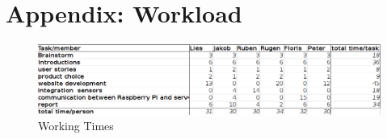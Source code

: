 \section{Appendix: Workload}
\begin{figure}[H]
  \center
  \includegraphics[width=1.5\linewidth, angle=90]{./appendix_working_times/workload.png}
  \caption{Working Times}
  \label{image:workload}
\end{figure}